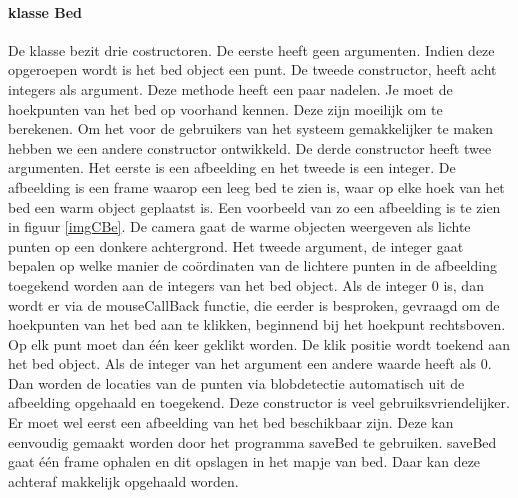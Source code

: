 \paragraph{klasse Bed}
De klasse bezit drie costructoren. De eerste heeft geen argumenten. Indien deze opgeroepen wordt is het bed object een punt. De tweede constructor, heeft acht integers als argument. Deze methode heeft een paar nadelen. Je moet de hoekpunten van het bed op voorhand kennen. Deze zijn moeilijk om te berekenen. Om het voor de gebruikers van het systeem gemakkelijker te maken hebben we een andere constructor ontwikkeld.  De derde constructor heeft twee argumenten. Het eerste is een afbeelding en het tweede is een integer. De afbeelding is een frame waarop een leeg bed te zien is, waar op elke hoek van het bed een warm object geplaatst is. Een voorbeeld van zo een afbeelding is te zien in figuur \ref{imgCBe}. De camera gaat de warme objecten weergeven als lichte punten op een donkere achtergrond. Het tweede argument, de integer gaat bepalen op welke manier de co\"ordinaten van de lichtere punten in de afbeelding toegekend worden aan de integers van het bed object. Als de integer 0 is, dan wordt er via de mouseCallBack functie, die eerder is besproken, gevraagd om de hoekpunten van het bed aan te klikken, beginnend bij het hoekpunt rechtsboven. Op elk punt moet dan \'e\'en keer geklikt worden. De klik positie wordt toekend aan het bed object. Als de integer van het argument een andere waarde heeft als 0. Dan worden de locaties van de punten via blobdetectie automatisch uit de afbeelding opgehaald en toegekend. Deze constructor is veel gebruiksvriendelijker. Er moet wel eerst een afbeelding van het bed beschikbaar zijn. Deze kan eenvoudig gemaakt worden door het programma saveBed te gebruiken. saveBed gaat \'e\'en frame ophalen en dit opslagen in het mapje van bed. Daar kan deze achteraf makkelijk opgehaald worden.\\
